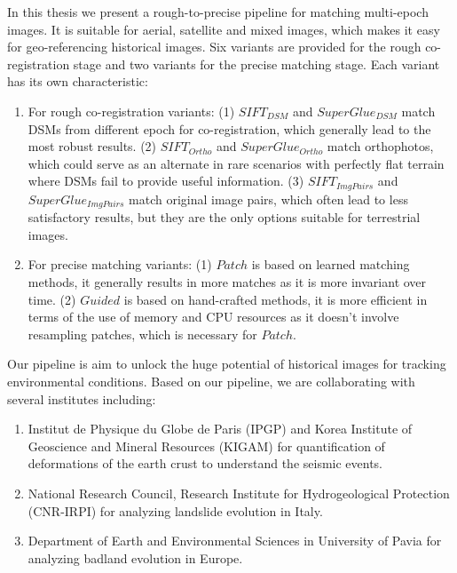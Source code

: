 In this thesis we present a rough-to-precise pipeline for matching multi-epoch images. It is suitable for aerial, satellite and mixed images, which makes it easy for geo-referencing historical images. Six variants are provided for the rough co-registration stage and two variants for the precise matching stage. Each variant has its own characteristic:\\
\begin{enumerate}
	\item For rough co-registration variants: (1) $SIFT_{DSM}$ and $SuperGlue_{DSM}$ match \ac{DSM}s from different epoch for co-registration, which generally lead to the most robust results. (2) $SIFT_{Ortho}$ and $SuperGlue_{Ortho}$ match orthophotos, which could serve as an alternate in rare scenarios with perfectly flat terrain where \ac{DSM}s fail to provide useful information. (3) $SIFT_{ImgPairs}$ and $SuperGlue_{ImgPairs}$ match original image pairs, which often lead to less satisfactory results, but they are the only options suitable for terrestrial images.
	\item For precise matching variants: (1) $Patch$ is based on learned matching methods, it generally results in more matches as it is more invariant over time. (2) $Guided$ is based on hand-crafted methods, it is more efficient in terms of the use of memory and CPU resources as it doesn't involve resampling patches, which is necessary for $Patch$. %
\end{enumerate}
\par
Our pipeline is aim to unlock the huge potential of historical images for tracking environmental conditions.
Based on our pipeline, we are collaborating with several institutes including:
\begin{enumerate}
	\item Institut de Physique du Globe de Paris (IPGP) and Korea Institute of Geoscience and Mineral Resources (KIGAM) for quantification of deformations of the earth crust to understand the seismic events.
	\item National Research Council, Research Institute for Hydrogeological Protection (CNR-IRPI) for analyzing landslide evolution in Italy.
	\item Department of Earth and Environmental Sciences in University of Pavia for analyzing badland evolution in Europe.
\end{enumerate}
